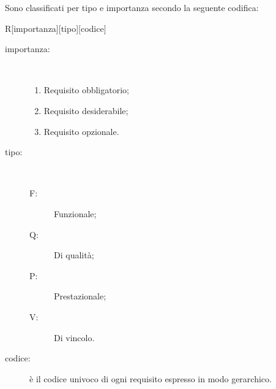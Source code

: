 Sono classificati per tipo e importanza secondo la seguente codifica:
\begin{center}
R[importanza][tipo][codice]
\end{center}

\begin{description}
\item[importanza:] \hfill \\
	\setcounter{enumi}{-1}
	\begin{enumerate}
	\item Requisito obbligatorio;
	\item Requisito desiderabile;
	\item Requisito opzionale.
	\end{enumerate}
\item[tipo:] \hfill \\
	\begin{description}
	\item[F:] Funzionale;
	\item[Q:] Di qualità;
	\item[P:] Prestazionale;
	\item[V:] Di vincolo.
	\end{description}
\item[codice:] è il codice univoco di ogni requisito espresso in modo gerarchico.
\end{description}
